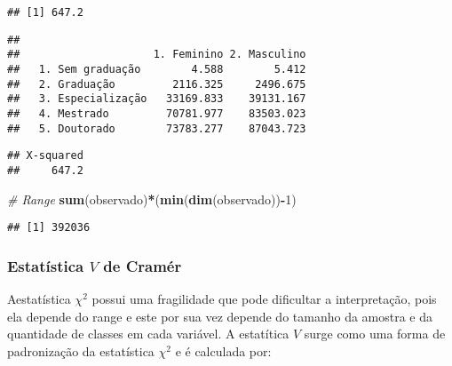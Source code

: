 \documentclass[11pt,]{style/krantz}
\makeatletter
\newenvironment{Shaded}{\begin{snugshade}}{\end{snugshade}}
\newcommand{\CommentTok}[1]{\textcolor[rgb]{0.56,0.35,0.01}{\textit{#1}}}
\newcommand{\DecValTok}[1]{\textcolor[rgb]{0.00,0.00,0.81}{#1}}
\newcommand{\KeywordTok}[1]{\textcolor[rgb]{0.13,0.29,0.53}{\textbf{#1}}}
\newcommand{\NormalTok}[1]{#1}
\newcommand{\OperatorTok}[1]{\textcolor[rgb]{0.81,0.36,0.00}{\textbf{#1}}}
\newcommand{\StringTok}[1]{\textcolor[rgb]{0.31,0.60,0.02}{#1}}
\newenvironment{kframe}{%
\medskip{}
\setlength{\fboxsep}{.8em}
 \def\at@end@of@kframe{}%
 \ifinner\ifhmode%
  \def\at@end@of@kframe{\end{minipage}}%
  \begin{minipage}{\columnwidth}%
 \fi\fi%
 \def\FrameCommand##1{\hskip\@totalleftmargin \hskip-\fboxsep
 \colorbox{shadecolor}{##1}\hskip-\fboxsep
     \hskip-\linewidth \hskip-\@totalleftmargin \hskip\columnwidth}%
 \MakeFramed {\advance\hsize-\width
   \@totalleftmargin\z@ \linewidth\hsize
   \@setminipage}}%
 {\par\unskip\endMakeFramed%
 \at@end@of@kframe}
\renewenvironment{Shaded}{\begin{kframe}}{\end{kframe}}
\theoremstyle{definition}
\theoremstyle{definition}
\theoremstyle{definition}
\theoremstyle{remark}
\makeatother
\begin{document}
\begin{verbatim}
## [1] 647.2
\end{verbatim}

\begin{Shaded}
\end{Shaded}

\begin{verbatim}
##                    
##                     1. Feminino 2. Masculino
##   1. Sem graduação        4.588        5.412
##   2. Graduação         2116.325     2496.675
##   3. Especialização   33169.833    39131.167
##   4. Mestrado         70781.977    83503.023
##   5. Doutorado        73783.277    87043.723
\end{verbatim}

\begin{Shaded}
\end{Shaded}

\begin{verbatim}
## X-squared 
##     647.2
\end{verbatim}

\begin{Shaded}
\begin{Highlighting}[]
\CommentTok{# Range}
\KeywordTok{sum}\NormalTok{(observado)}\OperatorTok{*}\NormalTok{(}\KeywordTok{min}\NormalTok{(}\KeywordTok{dim}\NormalTok{(observado))}\OperatorTok{-}\DecValTok{1}\NormalTok{)}
\end{Highlighting}
\end{Shaded}

\begin{verbatim}
## [1] 392036
\end{verbatim}

\hypertarget{estatistica-v-de-cramer}{%
\subsubsection{\texorpdfstring{Estatística \(V\) de Cramér}{Estatística V de Cramér}}\label{estatistica-v-de-cramer}}

Aestatística \(\chi^2\) possui uma fragilidade que pode dificultar a interpretação, pois ela depende do range e este por sua vez depende do tamanho da amostra e da quantidade de classes em cada variável. A estatítica \(V\) surge como uma forma de padronização da estatística \(\chi^2\) e é calculada por:
\end{document}
